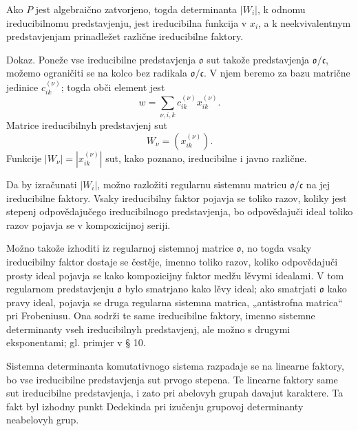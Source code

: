 \documentclass[11pt]{article}
\providecommand{\mo}{\mathfrak{o}}
\providecommand{\mc}{\mathfrak{c}}
\begin{document}
Ako $P$ jest algebraično zatvorjeno, togda determinanta $|W_i|$, k odnomu ireducibilnomu predstavjenju, jest ireducibilna funkcija v $x_i$, a k neekvivalentnym predstavjenjam prinadležet različne ireducibilne faktory.

Dokaz. Poneže vse ireducibilne predstavjenja $\mo$ sut takože predstavjenja $\mo/\mc$, možemo ograničiti se na kolco bez radikala $\mo/\mc$. V njem beremo za bazu matrične jedinice $c_{ik}^{(\nu)}$; togda obči element jest
\[
        w=\sum_{\nu,i,k}c_{ik}^{(\nu)}x_{ik}^{(\nu)}.
\]
Matrice ireducibilnyh predstavjenj sut
\[
        W_\nu=(x_{ik}^{(\nu)}).
\]
Funkcije $|W_\nu|=|x_{ik}^{(\nu)}|$ sut, kako poznano, ireducibilne i javno različne.

Da by izračunati $|W_i|$, možno razložiti regularnu sistemnu matricu $\mo/\mc$ na jej ireducibilne faktory. Vsaky ireducibilny faktor pojavja se toliko razov, koliky jest stepenj odpovědajučego ireducibilnogo predstavjenja, bo odpovědajuči ideal toliko razov pojavja se v kompozicijnoj seriji.

Možno takože izhoditi iz regularnoj sistemnoj matrice $\mo$, no togda vsaky ireducibilny faktor dostaje se čestěje, imenno toliko razov, koliko odpovědajuči prosty ideal pojavja se kako kompozicijny faktor medžu lěvymi idealami. V tom regularnom predstavjenju $\mo$ bylo smatrjano kako lěvy ideal; ako smatrjati $\mo$ kako pravy ideal, pojavja se druga regularna sistemna matrica, „antistrofna matrica“ pri Frobeniusu. Ona sodrži te same ireducibilne faktory, imenno sistemne determinanty vseh ireducibilnyh predstavjenj, ale možno s drugymi eksponentami; gl. primjer v § 10.

Sistemna determinanta komutativnogo sistema razpadaje se na linearne faktory, bo vse ireducibilne predstavjenja sut prvogo stepena. Te linearne faktory same sut ireducibilne predstavjenja, i zato pri abelovyh grupah davajut karaktere. Ta fakt byl izhodny punkt Dedekinda pri izučenju grupovoj determinanty neabelovyh grup.
\end{document}
